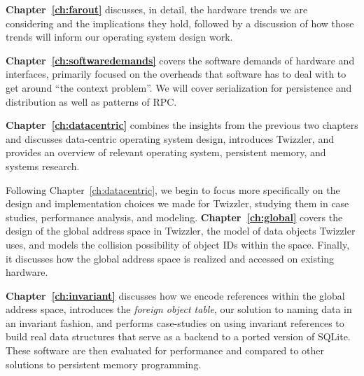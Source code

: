 
\noindent\textbf{Chapter~\ref{ch:farout}} discusses, in detail, the hardware trends we are considering and the implications they
hold, followed by a discussion of how those trends will inform our operating system design work.

\vspace{2em}

\noindent\textbf{Chapter~\ref{ch:softwaredemands}} covers the software demands of hardware and interfaces, primarily focused on
the overheads that software has to deal with to get around ``the context problem''. We will cover
serialization for
persistence and distribution as well as patterns of RPC.

\vspace{2em}

\noindent\textbf{Chapter~\ref{ch:datacentric}} combines the insights from the previous two chapters and discusses data-centric
operating system design, introduces Twizzler, and provides an overview of relevant operating system, persistent memory,
and systems research.

\vspace{2em}

\noindent Following Chapter~\ref{ch:datacentric}, we begin to focus more specifically on the design and implementation choices we
made for Twizzler, studying them in case studies, performance analysis, and modeling.
\textbf{Chapter~\ref{ch:global}} covers the design of the global address space in Twizzler, the model of data objects
Twizzler uses, and models the collision possibility of object IDs within the space. Finally, it discusses how the global
address space is realized and accessed on existing hardware.

\vspace{2em}

\noindent\textbf{Chapter~\ref{ch:invariant}} discusses how we encode references within the global address space, introduces the
\emph{foreign object table}, our solution to naming data in an invariant fashion, and performs case-studies on using
invariant references to build real data structures that serve as a backend to a ported version of SQLite. These software
are then evaluated for performance and compared to other solutions to persistent memory programming.

\vspace{2em}

